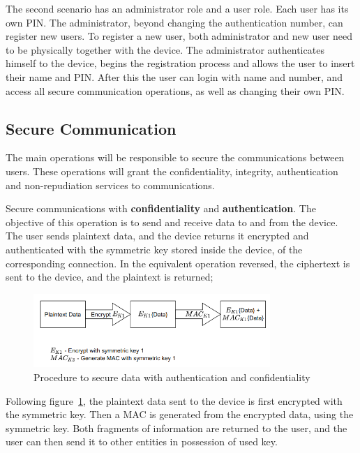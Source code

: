 The second scenario has an administrator role and a user role. Each user has its own \ac{PIN}. The administrator, beyond changing the authentication number, can register new users. To register a new user, both administrator and new user need to be physically together with the device. The administrator authenticates himself to the device, begins the registration process and allows the user to insert their name and \ac{PIN}. After this the user can login with name and number, and access all secure communication operations, as well as changing their own \ac{PIN}.

\subsection{Secure Communication}\label{chap:arch:ops:comms}

The main operations will be responsible to secure the communications between users. These operations will grant the confidentiality, integrity, authentication and non-repudiation services to communications.

Secure communications with \textbf{confidentiality} and \textbf{authentication}. The objective of this operation is to send and receive data to and from the device. The user sends plaintext data, and the device returns it encrypted and authenticated with the symmetric key stored inside the device, of the corresponding connection. In the equivalent operation reversed, the ciphertext is sent to the device, and the plaintext is returned;

\begin{figure}[h]
    \centering
    \includegraphics[width=0.8\textwidth]{./Images/arch-comms.png}
    \caption{Procedure to secure data with authentication and confidentiality}
    \label{fig:arch-comms}
\end{figure}

Following figure~\ref{fig:arch-comms}, the plaintext data sent to the device is first encrypted with the symmetric key. Then a \ac{MAC} is generated from the encrypted data, using the symmetric key. Both fragments of information are returned to the user, and the user can then send it to other entities in possession of used key.


